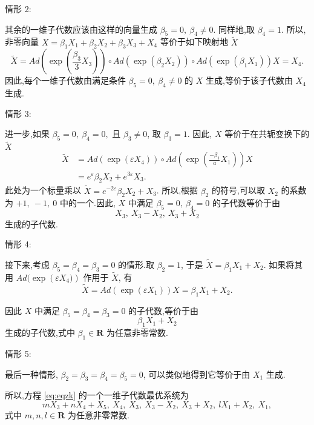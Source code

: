情形 2:

其余的一维子代数应该由这样的向量生成 $\beta_5=0, ~\beta_4\neq 0$. 同样地,取 $\beta_4=1$. 所以,非零向量 $X=\beta_{1}X_{1}+\beta_{2}X_{2}+\beta_{3}X_{3}+X_{4}$ 等价于如下映射地 $\widetilde{X}$
\begin{equation*}
	\widetilde{X}= Ad(\exp{(\frac{\beta_3}{3} X_3)})\circ Ad(\exp{(\beta_2 X_2)})\circ Ad(\exp{(\beta_1 X_1)}) X=X_{4}.
\end{equation*}
因此,每个一维子代数由满足条件 $\beta_5=0,~ \beta_4\neq 0$ 的 $X$ 生成,等价于该子代数由 $X_{4}$ 生成.

情形 3:

进一步,如果 $\beta_5=0,~\beta_4=0,$ 且 $\beta_3\neq 0$, 取 $\beta_3=1$. 因此, $X$ 等价于在共轭变换下的 $\widetilde{X}$
\begin{equation*}
\begin{aligned}
\widetilde{X}&=Ad(\exp(\varepsilon X_{4}))\circ Ad(\exp{(\frac{-\beta_1}{a} X_1)}) X\\
&=e^{\varepsilon}\beta_{2}X_{2}+e^{3\varepsilon}X_{3}.
\end{aligned}
\end{equation*}
此处为一个标量乘以 $\widetilde{X}=e^{-2\varepsilon}\beta_{2}X_{2}+X_{3}$. 所以,根据 $\beta_{2}$ 的符号,可以取 $X_{2}$ 的系数为 $+1,~-1,~0$ 中的一个.因此, $X$ 中满足 $\beta_5=0,~\beta_4=0$ 的子代数等价于由
\begin{equation*}
	X_{3}, ~X_{3}-X_{2}, ~X_{3}+X_{2}
\end{equation*}
生成的子代数.

情形 4:

接下来,考虑 $\beta_5=\beta_4=\beta_3=0$ 的情形.取 $\beta_2=1$, 于是 $\widetilde{X}=\beta_{1}X_{1}+X_{2}$. 如果将其用 $Ad(\exp({\varepsilon X_4)})$ 作用于 $\widetilde{X}$, 有
\begin{equation*}
	\widetilde{X}=Ad(\exp{(\varepsilon X_1)}) X=\beta_{1}X_{1}+X_{2}.
\end{equation*}

因此 $X$ 中满足 $\beta_5=\beta_4=\beta_3=0$ 的子代数,等价于由
\begin{equation*}
	\beta_{1}X_{1}+X_{2}
\end{equation*}
生成的子代数,式中 $\beta_{1} \in \mathbf{R}$ 为任意非零常数.

情形 5:

最后一种情形, $\beta_{2}=\beta_{3}=\beta_{4}=\beta_{5}=0$, 可以类似地得到它等价于由 $X_1$ 生成.

所以,方程 \eqref{eq:eqzk} 的一个一维子代数最优系统为
\begin{equation*}
	mX_{3}+nX_{4}+X_{5}, ~X_{4},~ X_{3}, ~X_{3}-X_{2},~ X_{3}+X_{2},~ lX_{1}+X_{2}, ~X_{1},
\end{equation*}
式中 $m,n,l\in \mathbf{R}$ 为任意非零常数.

